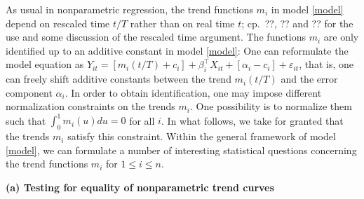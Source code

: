 \documentclass[a4paper,12pt]{article}
\begin{document}
As usual in nonparametric regression, the trend functions $m_i$ in model \eqref{model} depend on rescaled time $t/T$ rather than on real time $t$; cp.\ ??, ?? and ?? for the use and some discussion of the rescaled time argument. The functions $m_i$ are only identified up to an additive constant in model \eqref{model}: One can reformulate the model equation as $Y_{it} = [m_i(t/T) + c_i] + \beta_i^\top X_{it} + [\alpha_i - c_i] + \varepsilon_{it}$, that is, one can freely shift additive constants between the trend $m_i(t/T)$ and the error component $\alpha_i$. In order to obtain identification, one may impose different normalization constraints on the trends $m_i$. One possibility is to normalize them such that $\int_0^1 m_i(u) du = 0$ for all $i$. In what follows, we take for granted that the trends $m_i$ satisfy this constraint. 
Within the general framework of model \eqref{model}, we can formulate a number of interesting statistical questions concerning the trend functions $m_i$ for $1 \le i \le n$. 
\vspace{15pt}


\noindent \textbf{(a) Testing for equality of nonparametric trend curves } 
\vspace{10pt} 
\end{document}
